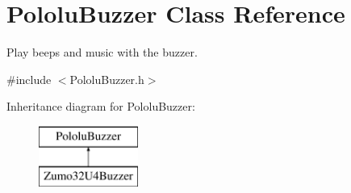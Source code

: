 \hypertarget{class_pololu_buzzer}{}\section{Pololu\+Buzzer Class Reference}
\label{class_pololu_buzzer}


Play beeps and music with the buzzer.  




{\ttfamily \#include $<$Pololu\+Buzzer.\+h$>$}

Inheritance diagram for Pololu\+Buzzer\+:\begin{figure}[H]
\begin{center}
\leavevmode
\includegraphics[height=2.000000cm]{class_pololu_buzzer}
\end{center}
\end{figure}

